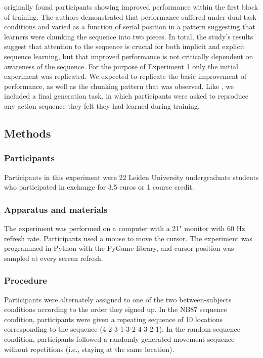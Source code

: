 \documentclass[man,floatsintext]{apa6}
\begin{document}
 originally found participants showing improved performance within the first block of training. The authors demonstrated that performance suffered under dual-task conditions and varied as a function of serial position in a pattern suggesting that learners were chunking the sequence into two pieces. In total, the study's results suggest that attention to the sequence is crucial for both implicit and explicit sequence learning, but that improved performance is not critically dependent on awareness of the sequence. For the purpose of Experiment 1 only the initial experiment was replicated. We expected to replicate the basic improvement of performance, as well as the chunking pattern that was observed. Like , we included a final generation task, in which participants were asked to reproduce any action sequence they felt they had learned during training.

\subsection{Methods}

\subsubsection{Participants}

Participants in this experiment were 22 Leiden University undergraduate students who participated in exchange for 3.5 euros or 1 course credit.

\subsubsection{Apparatus and materials}

The experiment was performed on a computer with a 21" monitor with 60 Hz refresh rate. Participants used a mouse to move the cursor. The experiment was programmed in Python with the PyGame library, and cursor position was sampled at every screen refresh. 

\subsubsection{Procedure}

Participants were alternately assigned to one of the two between-subjects conditions according to the order they signed up. In the NB87 sequence condition, participants were given a repeating sequence of 10 locations corresponding to the  sequence (4-2-3-1-3-2-4-3-2-1). In the random sequence condition, participants followed a randomly generated movement sequence without repetitions (i.e., staying at the same location). 
\end{document}
